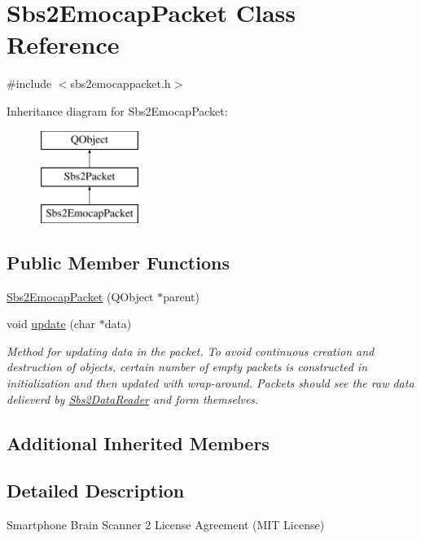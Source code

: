 \hypertarget{classSbs2EmocapPacket}{\section{Sbs2\-Emocap\-Packet Class Reference}
\label{classSbs2EmocapPacket}
}


{\ttfamily \#include $<$sbs2emocappacket.\-h$>$}

Inheritance diagram for Sbs2\-Emocap\-Packet\-:\begin{figure}[H]
\begin{center}
\leavevmode
\includegraphics[height=3.000000cm]{classSbs2EmocapPacket}
\end{center}
\end{figure}
\subsection*{Public Member Functions}
\begin{DoxyCompactItemize}
\item 
\hyperlink{classSbs2EmocapPacket_a526fe093d78aec14bd3cb87e108c4f54}{Sbs2\-Emocap\-Packet} (Q\-Object $\ast$parent)
\item 
void \hyperlink{classSbs2EmocapPacket_a68263221ddb233ea7d8da392203a523e}{update} (char $\ast$data)
\begin{DoxyCompactList}\small\item\em Method for updating data in the packet. To avoid continuous creation and destruction of objects, certain number of empty packets is constructed in initialization and then updated with wrap-\/around. Packets should see the raw data delieverd by \hyperlink{classSbs2DataReader}{Sbs2\-Data\-Reader} and form themselves. \end{DoxyCompactList}\end{DoxyCompactItemize}
\subsection*{Additional Inherited Members}


\subsection{Detailed Description}
Smartphone Brain Scanner 2 License Agreement (M\-I\-T License)

